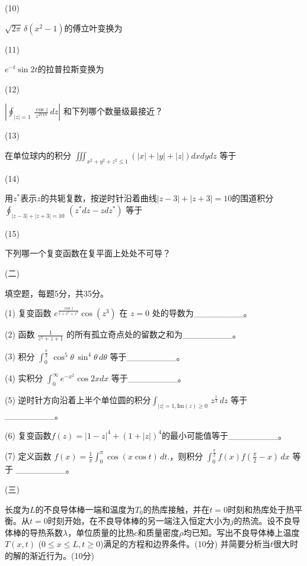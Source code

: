 \documentclass[12pt,CJK]{article}
\begin{document}
{\item[(10)]{$\sqrt{2\pi}\,\delta (x^2-1)$的傅立叶变换为 \bropt

  }

\item[(11)]{$e^{-t}\sin{2t}$的拉普拉斯变换为 \bropt

  }

\item[(12)]{$ \left\vert\oint_{|z|=1}\, \frac{\cos z}{z^{2719}}\,dz\right\vert$ 和下列哪个数量级最接近？ \bropt

  }

\item[(13)]{ 在单位球内的积分 $\iiint_{x^2+y^2+z^2\le 1} (|x|+|y|+|z|)dxdydz$ 等于\bropt

  }
  
\item[(14)]{用$z^*$表示$z$的共轭复数，按逆时针沿着曲线$|z-3|+|z+3|=10$的围道积分$\oint_{|z-3|+|z+3|=10}\, (z^*dz - zdz^*)$  等于 \bropt
  
  \optlist{$48\pi\ii$}{$60\pi\ii$}{$80\pi\ii$}{$96\pi\ii$}}

\item[(15)]{下列哪一个复变函数在复平面上处处不可导？ \bropt

   }  
    
  \eitem
  
\vspace{1in}
  }
\item[(二)]{ 填空题，每题5分，共35分。

  \bitem  
\item[(1)]{复变函数 $e^{\frac{\cos z}{1+z^2+z^4}}\cos{(z^3)}$ 在 $z=0$ 处的导数为\_\_\_\_\_\_\_\_。 }  
\item[(2)]{函数 $\frac{1}{z^{5}+z+1}$ 的所有孤立奇点处的留数之和为\_\_\_\_\_\_\_\_。}  
\item[(3)]{积分 $\int_0^{\frac{\pi}{2}}\, \cos^5\theta \, \sin^4\theta\, d\theta$ 等于\_\_\_\_\_\_\_\_。   }
\item[(4)]{实积分 $\int_0^\infty e^{-x^2}\cos{2x}dx$ 等于\_\_\_\_\_\_\_\_。}
\item[(5)]{逆时针方向沿着上半个单位圆的积分$\int_{|z|=1, \mathrm{Im}(z)\ge 0}\, z^{\frac{1}{3}}\,dz$ 等于\_\_\_\_\_\_\_\_。}
\item[(6)]{复变函数$f(z) = |1-z|^4 + (1+|z|)^4$的最小可能值等于\_\_\_\_\_\_\_\_。}   
\item[(7)]{定义函数  $f(x) = \frac{1}{\pi}\int_0^\pi \cos{\left( x \cos t\right)} \, dt. $，则积分 $\int_0^{\frac{\pi}{2}} f(x)f(\frac{\pi}{2}-x)\,dx$ 等于 \_\_\_\_\_\_\_\_。}
\eitem

  }
  

\item[(三)]{长度为$L$的不良导体棒一端和温度为$T_0$的热库接触，并在$t=0$时刻和热库处于热平衡。从$t=0$时刻开始，在不良导体棒的另一端注入恒定大小为$j$的热流。设不良导体棒的导热系数$\lambda$，单位质量的比热$c$和质量密度$\rho$均已知。写出不良导体棒上温度$T(x, t)$ ($0\le x\le L, t\ge 0$)满足的方程和边界条件。(10分) 并简要分析当$t$很大时的解的渐近行为。(10分)

}
\eitem    


\ech
\end{document}
